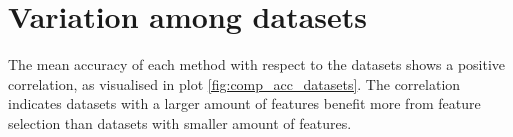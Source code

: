 
\section{Variation among datasets}
\label{Variation_among_datasets}

The mean accuracy of each method with respect to the datasets shows a positive correlation, as visualised in plot \ref{fig:comp_acc_datasets}. The correlation indicates datasets with a larger amount of features benefit more from feature selection than datasets with smaller amount of features.

